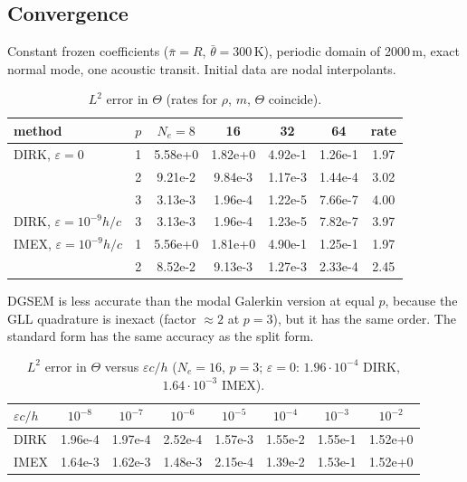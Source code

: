 \documentclass[11pt,a4paper]{article}
\newcommand{\thb}{\bar\theta}
\newcommand{\pib}{\bar\pi}
\begin{document}
\subsection{Convergence}
Constant frozen coefficients ($\pib=R$, $\thb=300$\,K), periodic domain of 2000\,m, exact normal
mode, one acoustic transit. Initial data are nodal interpolants.
\begin{table}[h]\centering
\caption{$L^2$ error in $\Theta$ (rates for $\rho$, $m$, $\Theta$ coincide).}
\begin{tabular}{llccccc}\toprule
method & $p$ & $N_e=8$ & 16 & 32 & 64 & rate\\\midrule
DIRK, $\varepsilon=0$ & 1 & 5.58e+0 & 1.82e+0 & 4.92e-1 & 1.26e-1 & 1.97\\
 & 2 & 9.21e-2 & 9.84e-3 & 1.17e-3 & 1.44e-4 & 3.02\\
 & 3 & 3.13e-3 & 1.96e-4 & 1.22e-5 & 7.66e-7 & 4.00\\
DIRK, $\varepsilon=10^{-9}h/c$ & 3 & 3.13e-3 & 1.96e-4 & 1.23e-5 & 7.82e-7 & 3.97\\
IMEX, $\varepsilon=10^{-9}h/c$ & 1 & 5.56e+0 & 1.81e+0 & 4.90e-1 & 1.25e-1 & 1.97\\
 & 2 & 8.52e-2 & 9.13e-3 & 1.27e-3 & 2.33e-4 & 2.45\\\bottomrule
\end{tabular}
\end{table}
DGSEM is less accurate than the modal Galerkin version at equal $p$, because the GLL quadrature is
inexact (factor $\approx2$ at $p=3$), but it has the same order. The standard form has the same
accuracy as the split form.

\begin{table}[h]\centering
\caption{$L^2$ error in $\Theta$ versus $\varepsilon c/h$ ($N_e=16$, $p=3$; $\varepsilon=0$:
$1.96\cdot10^{-4}$ DIRK, $1.64\cdot10^{-3}$ IMEX).}
\begin{tabular}{lccccccc}\toprule
$\varepsilon c/h$ & $10^{-8}$ & $10^{-7}$ & $10^{-6}$ & $10^{-5}$ & $10^{-4}$ & $10^{-3}$ & $10^{-2}$\\\midrule
DIRK & 1.96e-4 & 1.97e-4 & 2.52e-4 & 1.57e-3 & 1.55e-2 & 1.55e-1 & 1.52e+0\\
IMEX & 1.64e-3 & 1.62e-3 & 1.48e-3 & 2.15e-4 & 1.39e-2 & 1.53e-1 & 1.52e+0\\\bottomrule
\end{tabular}
\end{table}
\end{document}
